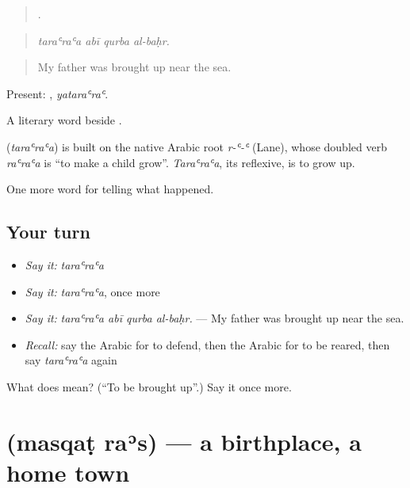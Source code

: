\begin{quote}
   .
\end{quote}

\begin{quote}
\emph{taraʿraʿa abī qurba al-baḥr.}
\end{quote}

\begin{quote}
My father was brought up near the sea.
\end{quote}

Present: , \emph{yataraʿraʿ}.

A literary word beside .

\begin{cousinweb}
\textbf{} (\emph{taraʿraʿa}) is built on the native Arabic root \emph{r-ʿ-ʿ} (Lane), whose doubled verb \emph{raʿraʿa} is \textquotedblleft{}to make a child grow\textquotedblright{}. \emph{Taraʿraʿa}, its reflexive, is to grow up.
\end{cousinweb}

\begin{grammarlens}[title={What you've built}]
One more word for telling what happened.
\end{grammarlens}

\subsection*{Your turn}
\begin{itemize}
\raggedright
  \item \emph{Say it:} \emph{taraʿraʿa}
  \item \emph{Say it:} \emph{taraʿraʿa}, once more
  \item \emph{Say it:} \emph{taraʿraʿa abī qurba al-baḥr.} — My father was brought up near the sea.
  \item \emph{Recall:} say the Arabic for to defend, then the Arabic for to be reared, then say \emph{taraʿraʿa} again
\end{itemize}

\begin{tcolorbox}[breakable,colback=teal!4,colframe=teal!35!black,title={Before you move on}]
What does  mean? (\textquotedblleft{}To be brought up\textquotedblright{}.) Say it once more.
\end{tcolorbox}
\section[\texorpdfstring{\ar{مسقط} \ar{رأس} (masqaṭ raʾs)}{مسقط رأس (masqaṭ raʾs)}]{  (masqaṭ raʾs) — a birthplace, a home town}

